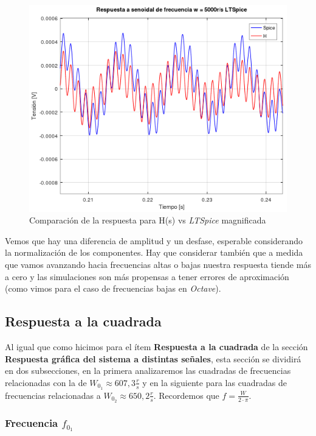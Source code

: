 \documentclass[11pt,a4paper]{report}
\begin{document}
\begin{figure}[h!]
\centering
\includegraphics[scale=0.96]{rtaSenoidalAltoSpiceCloseComp.png}
\caption{Comparación de la respuesta para H(s) vs \textit{LTSpice} magnificada}
\end{figure}

Vemos que hay una diferencia de amplitud y un desfase, esperable considerando la normalización de los componentes. Hay que considerar también que a medida que vamos avanzando hacia frecuencias altas o bajas nuestra respuesta tiende más a cero y las simulaciones son más propensas a tener errores de aproximación (como vimos para el caso de frecuencias bajas en \textit{Octave}).

\subsection*{Respuesta a la cuadrada}

Al igual que como hicimos para el ítem \textbf{Respuesta a la cuadrada} de la sección \textbf{Respuesta gráfica del sistema a distintas señales}, esta sección se dividirá en dos subsecciones, en la primera analizaremos las cuadradas de frecuencias relacionadas con la de $W_{0_{1}} \approx 607,3 \frac{r}{s}$ y en la siguiente para las cuadradas de frecuencias relacionadas a $W_{0_{2}} \approx 650,2 \frac{r}{s}$. Recordemos que $f = \frac{W}{2 \cdot \pi}$.

\subsubsection*{Frecuencia $f_{0_{1}}$}
\end{document}
